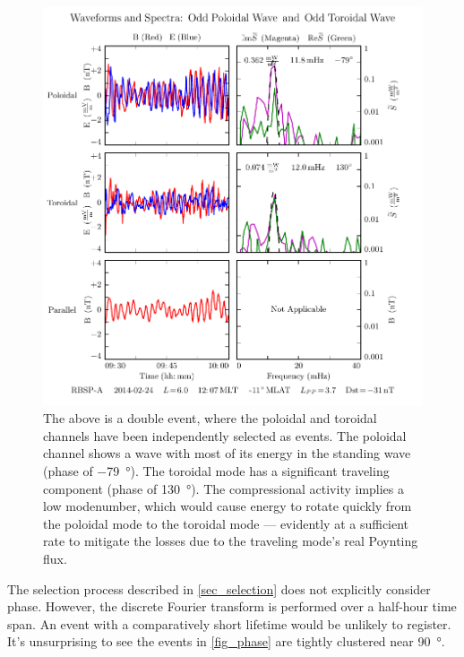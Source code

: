 \begin{figure}[!htb]
  \centering
  \includegraphics[width=\textwidth]{figures/sample_event_phase.pdf}
  \caption[Waveforms and Spectra for a Double Pc4 Event]{
    The above is a double event, where the poloidal and toroidal channels have
    been independently selected as events. The poloidal channel shows a wave
    with most of its energy in the standing wave (phase of \SI{-79}{\degree}).
    The toroidal mode has a significant traveling component (phase of
    \SI{130}{\degree}). The compressional activity implies a low modenumber,
    which would cause energy to rotate quickly from the poloidal mode to the
    toroidal mode --- evidently at a sufficient rate to mitigate the losses
    due to the traveling mode's real Poynting flux. 
  }
  \label{fig_sample_event_phase}
\end{figure}

The selection process described in \cref{sec_selection} does not explicitly
consider phase. However, the discrete Fourier transform is performed over a
half-hour time span. An event with a comparatively short lifetime would be
unlikely to register. It's unsurprising to see the events in \cref{fig_phase}
are tightly clustered near \SI{90}{\degree}. 

